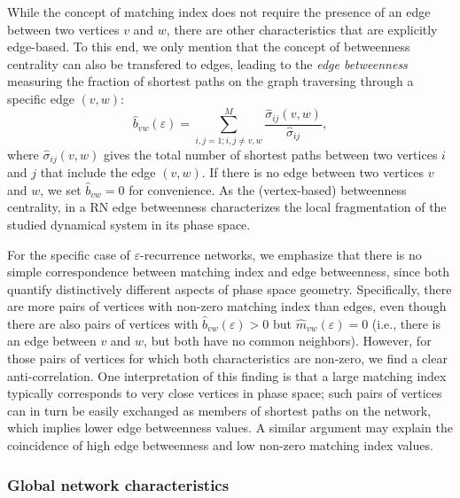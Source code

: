 While the concept of matching index does not require the presence of an edge between two vertices $v$ and $w$, there are other characteristics that are explicitly edge-based. To this end, we only mention that the concept of betweenness centrality can also be transfered to edges, leading to the \textit{edge betweenness} measuring the fraction of shortest paths on the graph traversing through a specific edge $(v,w)$:
\begin{equation}
\hat{b}_{vw}(\varepsilon)=\sum_{i,j=1; i,j\neq v,w}^M \frac{\hat{\sigma}_{ij}(v,w)}{\hat{\sigma}_{ij}},
\label{eq:edgebetweenness}
\end{equation}
\noindent
where $\hat{\sigma}_{ij}(v,w)$ gives the total number of shortest paths between two vertices $i$ and $j$ that include the edge $(v,w)$. If there is no edge between two vertices $v$ and $w$, we set $\hat{b}_{vw}=0$ for convenience. As the (vertex-based) betweenness centrality, in a RN edge betweenness characterizes the local fragmentation of the studied dynamical system in its phase space.
        
For the specific case of $\varepsilon$-recurrence networks, we emphasize that there is no simple correspondence between matching index and edge betweenness, since both quantify distinctively different aspects of phase space geometry. Specifically, there are more pairs of vertices with non-zero matching index than edges, even though there are also pairs of vertices with $\hat{b}_{vw}(\varepsilon)>0$ but $\hat{m}_{vw}(\varepsilon)=0$ (i.e., there is an edge between $v$ and $w$, but both have no common neighbors). However, for those pairs of vertices for which both characteristics are non-zero, we find a clear anti-correlation. One interpretation of this finding is that a large matching index typically corresponds to very close vertices in phase space; such pairs of vertices can in turn be easily exchanged as members of shortest paths on the network, which implies lower edge betweenness values. A similar argument may explain the coincidence of high edge betweenness and low non-zero matching index values.
        
        
        
		\subsubsection{Global network characteristics}

